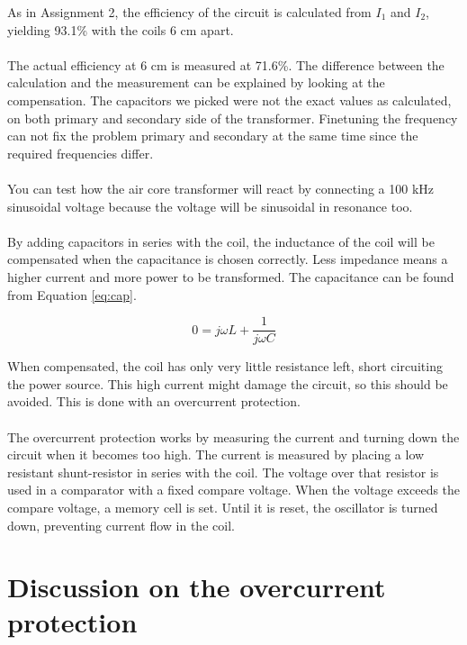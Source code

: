 \documentclass[final]{scrreprt} %
\begin{document}
As in Assignment 2, the efficiency of the circuit is calculated from $I_1$ and $I_2$, yielding 93.1\% with the coils 6 cm apart.
\\ \\
The actual efficiency at 6 cm is measured at 71.6\%.
The difference between the calculation and the measurement can be explained by looking at the compensation.
The capacitors we picked were not the exact values as calculated, on both primary and secondary side of the transformer.
Finetuning the frequency can not fix the problem primary and secondary at the same time since the required frequencies differ.
\\ \\
You can test how the air core transformer will react by connecting a 100 kHz sinusoidal voltage because the voltage will be sinusoidal in resonance too.
\\ \\ 
By adding capacitors in series with the coil, the inductance of the coil will be compensated when the capacitance is chosen correctly. Less impedance means a higher current and more power to be transformed. The capacitance can be found from Equation \ref{eq:cap}.

\begin{equation}
	0 = j \omega L + \frac{1}{j \omega C}
	\label{eq:cap}
\end{equation}

When compensated, the coil has only very little resistance left, short circuiting the power source. This high current might damage the circuit, so this should be avoided. This is done with an overcurrent protection.
\\ \\
The overcurrent protection works by measuring the current and turning down the circuit when it becomes too high. The current is measured by placing a low resistant shunt-resistor in series with the coil. The voltage over that resistor is used in a comparator with a fixed compare voltage. When the voltage exceeds the compare voltage, a memory cell is set. Until it is reset, the oscillator is turned down, preventing current flow in the coil.




\chapter{Discussion on the overcurrent protection}
\end{document}
